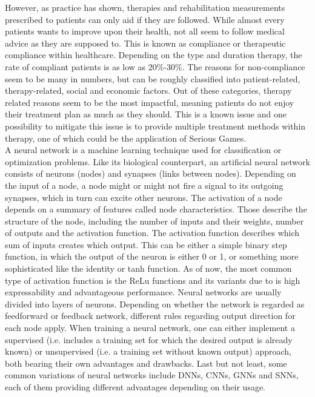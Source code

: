 \documentclass[draft,final]{vutinfth} %
\begin{document}
However, as practice has shown, therapies and rehabilitation measurements prescribed to patients can only aid if they are followed. While almost every patients wants to improve upon their health, not all seem to follow medical advice as they are supposed to. This is known as compliance or therapeutic compliance within healthcare. Depending on the type and duration therapy, the rate of compliant patients is as low as 20\%-30\%. The reasons for non-compliance seem to be many in numbers, but can be roughly classified into patient-related, therapy-related, social and economic factors. Out of these categories, therapy related reasons seem to be the most impactful, meaning patients do not enjoy their treatment plan as much as they should. This is a known issue and one possibility to mitigate this issue is to provide multiple treatment methods within therapy, one of which could be the application of Serious Games.
\\
A neural network is a machine learning technique used for classification or optimization problems. Like its biological counterpart, an artificial neural network consists of neurons (nodes) and synapses (links between nodes). Depending on the input of a node, a node might or might not fire a signal to its outgoing synapses, which in turn can excite other neurons. The activation of a node depends on a summary of features called node characteristics. Those describe the structure of the node, including the number of inputs and their weights, number of outputs and the activation function. The activation function describes which sum of inputs creates which output. This can be either a simple binary step function, in which the output of the neuron is either 0 or 1, or something more sophisticated like the identity or tanh function. As of now, the most common type of activation function is the ReLu functions and its variants due to is high expressability and advantageous performance. Neural networks are usually divided into layers of neurons. Depending on whether the network is regarded as feedforward or feedback network, different rules regarding output direction for each node apply. When training a neural network, one can either implement a supervised (i.e. includes a training set for which the desired output is already known) or unsupervised (i.e. a training set without known output) approach, both bearing their own advantages and drawbacks. Last but not least, some common variations of neural networks include DNNs, CNNs, GNNs and SNNs, each of them providing different advantages depending on their usage. \\
\end{document}

